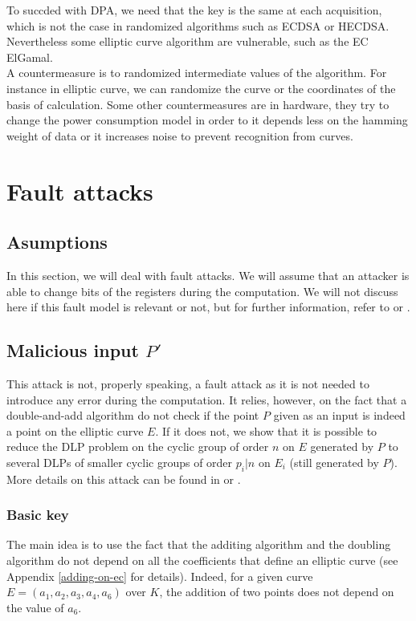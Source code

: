\documentclass[journal]{IEEEtran}
\begin{document}
To succded with DPA, we need that the key is the same at each acquisition, which is not the case in randomized algorithms such as ECDSA or HECDSA. Nevertheless some elliptic curve algorithm are vulnerable, such as the EC ElGamal.\\

A countermeasure is to randomized intermediate values of the algorithm. For instance in elliptic curve, we can randomize the curve or the coordinates of the basis of calculation. Some other countermeasures are  in hardware, they try to change the power consumption model in order to it depends less on the hamming weight of data or it increases noise to prevent recognition from curves.
        
\section{Fault attacks}
\label{fault}

\subsection{Asumptions}
In this section, we will deal with fault attacks. We will assume that an attacker is able to change bits of the registers
during the computation. We will not discuss here if this fault model is relevant or not, but for further information, 
refer to \cite{bar2006sorcerer} or \cite{giraud2004survey}.

\subsection{Malicious input $P'$}
\label{malicious}
This attack is not, properly speaking, a fault attack as it is not needed to introduce any 
error during the computation. It relies, however, on the fact that a double-and-add algorithm 
do not check if the point $P$ given as an input is indeed a point on the elliptic curve $E$.
If it does not, we show that it is possible to reduce the DLP problem on the cyclic group of order $n$ on $E$ generated by $P$ to 
several DLPs of smaller cyclic groups of order $p_i | n$ on $E_i$ (still generated by $P$).
More details on this attack can be found in \cite{biehl2000differential} or \cite{cohen2010handbook}.\\

\subsubsection{Basic key}
\label{malicious-basic}
The main idea is to use the fact that the additing algorithm and the doubling algorithm do not depend on 
all the coefficients that define an elliptic curve (see Appendix \ref{adding-on-ec} for details).
Indeed, for a given curve $E = (a_1, a_2, a_3, a_4, a_6)$ over $K$, the addition of two points does not
depend on the value of $a_6$.\\
\end{document}
